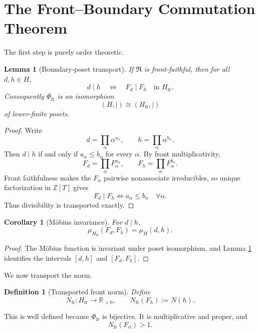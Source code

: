 \documentclass[11pt]{article}
\newcommand{\RR}{\mathbb R}
\newcommand{\ZZ}{\mathbb Z}
\newcommand{\cR}{\mathfrak R}
\newcommand{\fr}{\mathrm{fr}}
\newcommand{\Mob}{\mu}
\newcommand{\Div}{\mid}
\newtheorem{lemma}[theorem]{Lemma}
\newtheorem{corollary}[theorem]{Corollary}
\newtheorem{definition}[theorem]{Definition}
\begin{document}
\section{The Front--Boundary Commutation Theorem}

The first step is purely order theoretic.

\begin{lemma}[Boundary-poset transport]\label{lem:poset}
If $\cR$ is front-faithful, then for all $d,h\in H$,
\[
d\Div h
\quad\Longleftrightarrow\quad
F_d\Div F_h
\quad\text{in }H_{\fr}.
\]
Consequently $\Phi_{\fr}$ is an isomorphism
\[
(H,\Div)\cong(H_{\fr},\Div)
\]
of lower-finite posets.
\end{lemma}

\begin{proof}
Write
\[
d=\prod_\alpha\alpha^{a_\alpha},
\qquad
h=\prod_\alpha\alpha^{b_\alpha}.
\]
Then $d\Div h$ if and only if $a_\alpha\le b_\alpha$ for every $\alpha$. By front multiplicativity,
\[
F_d=\prod_\alpha F_\alpha^{a_\alpha},
\qquad
F_h=\prod_\alpha F_\alpha^{b_\alpha}.
\]
Front faithfulness makes the $F_\alpha$ pairwise nonassociate irreducibles, so unique factorization in $\ZZ[T]$ gives
\[
F_d\Div F_h
\iff
a_\alpha\le b_\alpha\quad\forall\alpha.
\]
Thus divisibility is transported exactly.
\end{proof}

\begin{corollary}[M\"obius invariance]\label{cor:mobius}
For $d\Div h$,
\[
\Mob_{H_{\fr}}(F_d,F_h)=\Mob_H(d,h).
\]
\end{corollary}

\begin{proof}
The M\"obius function is invariant under poset isomorphism, and Lemma \ref{lem:poset} identifies the intervals $[d,h]$ and $[F_d,F_h]$.
\end{proof}

We now transport the norm.

\begin{definition}[Transported front norm]\label{def:transport}
Define
\[
N_{\fr}:H_{\fr}\to\RR_{>0},
\qquad
N_{\fr}(F_h):=N(h).
\]
\end{definition}

This is well defined because $\Phi_{\fr}$ is bijective. It is multiplicative and proper, and
\[
N_{\fr}(F_\alpha)>1.
\]
\end{document}
